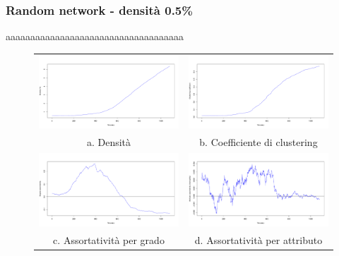 \documentclass[a4paper,12pt]{article}
\begin{document}
\subsubsection{Random network - densità 0.5\%}
aaaaaaaaaaaaaaaaaaaaaaaaaaaaaaaaaaaa
\begin{figure}[h]
\begin{tabular}{cc}
  \includegraphics[width=81mm]{images/evolution_1000_rnd_1080_05_0.pdf} &   \includegraphics[width=81mm]{images/clustering_1000_rnd_1080_05_0.pdf} \\
a. Densità & b. Coefficiente di clustering \\[6pt]
 \includegraphics[width=81mm]{images/deg_assortativity_1000_rnd_1080_05_0.pdf} &   \includegraphics[width=81mm]{images/homophily_1000_rnd_1080_05_0.pdf} \\
c. Assortatività per grado & d. Assortatività per attributo \\[6pt]
\end{tabular}
\end{figure}
\newpage
\end{document}
